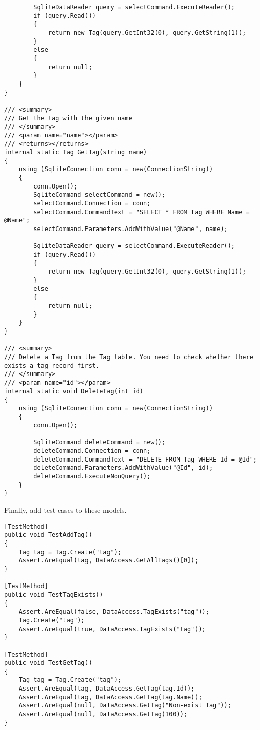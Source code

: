 \documentclass[report.tex]{subfiles}
\begin{document}
\begin{verbatim}
        SqliteDataReader query = selectCommand.ExecuteReader();
        if (query.Read())
        {
            return new Tag(query.GetInt32(0), query.GetString(1));
        }
        else
        {
            return null;
        }
    }
}

/// <summary>
/// Get the tag with the given name
/// </summary>
/// <param name="name"></param>
/// <returns></returns>
internal static Tag GetTag(string name)
{
    using (SqliteConnection conn = new(ConnectionString))
    {
        conn.Open();
        SqliteCommand selectCommand = new();
        selectCommand.Connection = conn;
        selectCommand.CommandText = "SELECT * FROM Tag WHERE Name = @Name";
        selectCommand.Parameters.AddWithValue("@Name", name);

        SqliteDataReader query = selectCommand.ExecuteReader();
        if (query.Read())
        {
            return new Tag(query.GetInt32(0), query.GetString(1));
        }
        else
        {
            return null;
        }
    }
}

/// <summary>
/// Delete a Tag from the Tag table. You need to check whether there exists a tag record first.
/// </summary>
/// <param name="id"></param>
internal static void DeleteTag(int id)
{
    using (SqliteConnection conn = new(ConnectionString))
    {
        conn.Open();

        SqliteCommand deleteCommand = new();
        deleteCommand.Connection = conn;
        deleteCommand.CommandText = "DELETE FROM Tag WHERE Id = @Id";
        deleteCommand.Parameters.AddWithValue("@Id", id);
        deleteCommand.ExecuteNonQuery();
    }
}
\end{verbatim}

Finally, add test cases to these models.

\begin{verbatim}
[TestMethod]
public void TestAddTag()
{
    Tag tag = Tag.Create("tag");
    Assert.AreEqual(tag, DataAccess.GetAllTags()[0]);
}

[TestMethod]
public void TestTagExists()
{
    Assert.AreEqual(false, DataAccess.TagExists("tag"));
    Tag.Create("tag");
    Assert.AreEqual(true, DataAccess.TagExists("tag"));
}

[TestMethod]
public void TestGetTag()
{
    Tag tag = Tag.Create("tag");
    Assert.AreEqual(tag, DataAccess.GetTag(tag.Id));
    Assert.AreEqual(tag, DataAccess.GetTag(tag.Name));
    Assert.AreEqual(null, DataAccess.GetTag("Non-exist Tag"));
    Assert.AreEqual(null, DataAccess.GetTag(100));
}
\end{verbatim}
\end{document}
